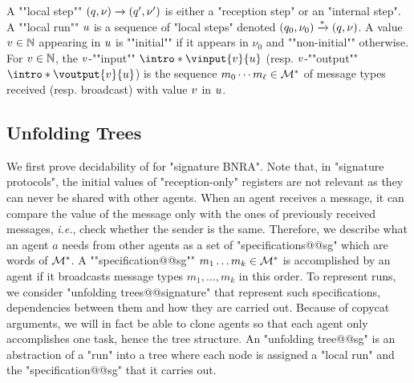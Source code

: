 	\AP A ""local step"" $(q,\nu) \xrightarrow{} (q',\nu')$ is either a "reception step" or an "internal step". 
	\AP A ""local run"" $u$ is a sequence of "local steps" denoted $(q_0, \nu_0) \xrightarrow{*} (q, \nu)$. %
	A value $v \in \mathbb{N}$ appearing in $u$ is ""initial"" if it appears in $\nu_0$ and ""non-initial"" otherwise. 
	For $v \in \mathbb{N}$, the $v$-""input"" $\intro*\vinput{\aval}{\localrun}$ (resp. $v$-""output"" $\intro*\voutput{\aval}{\localrun}$) is the sequence $m_0 \cdots m_{\ell} \in \mathcal{M}^*$ of message types received (resp. broadcast) with value $v$ in $u$.

\subsection{Unfolding Trees}
\label{sec:unfolding_tree_signature}

We first prove decidability of \COVER for "signature BNRA". Note that, in "signature protocols", the initial values of "reception-only" registers are not relevant as they can never be shared with other agents. When an agent receives a message, it can compare the value of the message only with the ones of previously received messages, \emph{i.e.}, check whether the sender is the same. Therefore, we describe what an agent $a$ needs from other agents as a set of "specifications@@sg" which are words of $\mathcal{M}^*$. 
A ""specification@@sg"" $m_1 \dots m_k \in \mathcal{M}^*$ is accomplished by an agent if it broadcasts message types $m_1, \dots, m_k$ in this order. To represent runs, we consider "unfolding trees@@signature" that represent such specifications, dependencies between them and how they are carried out. 
Because of copycat arguments, we will in fact be able to clone agents so that each agent only accomplishes one task, hence the tree structure.
An "unfolding tree@@sg" is an abstraction of a "run" into a tree where each node is assigned a "local run" and the "specification@@sg" that it carries out. 

